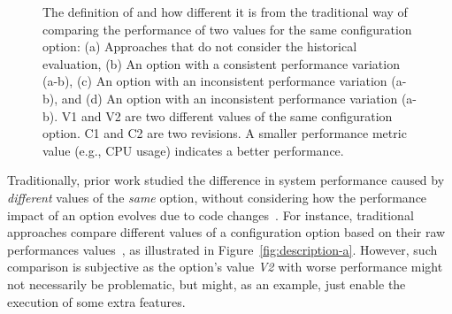 \begin{figure}[t]
\begin{subfigure}{0.25\textwidth}
                \label{fig:description-d}
        \end{subfigure}%
	\caption{%
	The definition of \inconsistent and how different it is from the traditional way of comparing the performance of two values for the same configuration option: (a) Approaches that do not consider the historical evaluation, (b) An option with a consistent performance variation (a-b), (c) An option with an inconsistent performance variation (a-b), and (d) An option with an inconsistent performance variation (a-b). V1 and V2 are two different values of the same configuration option. C1 and C2 are two revisions. A smaller performance metric value (e.g., CPU usage) indicates a better performance.
	}
	\label{fig:description}
\end{figure}



Traditionally, prior work studied the difference in system performance caused by \emph{different} values of the \emph{same} option, without considering how the performance impact of an option evolves due to code changes~\cite{tse}. For instance, traditional approaches compare different values of a configuration option based on their raw performances values~\cite{RN2880,RN3537,RN3543}, as illustrated in Figure~\ref{fig:description-a}. However, such comparison is subjective as
the option's value \emph{V2} with worse performance might not necessarily be problematic, but might, as an example, just enable the execution of some extra features.

